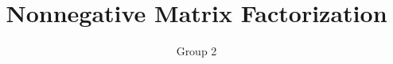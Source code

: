 \documentclass[final]{beamer}
\title{Nonnegative Matrix Factorization} %
\author{Group 2} %
\institute{Ecole Polytechnique de Louvain} %
\newlength{\sepwid}
\newlength{\onecolwid}
\newlength{\threecolwid}
\begin{document}

\setlength{\belowcaptionskip}{2ex} %
\setlength\belowdisplayshortskip{2ex} %
\begin{frame} %


  \begin{columns}
   \begin{column}{\linewidth}
    \vskip1cm
    \centering
   \end{column}
  \end{columns}


\begin{columns}[t] %
\begin{column}{\sepwid}\end{column} %
\begin{column}{\threecolwid}
\begin{columns}[t]

\begin{column}{\onecolwid} %



\end{column}
\end{columns}
\end{column}
\end{columns}
\end{frame}
\end{document}
